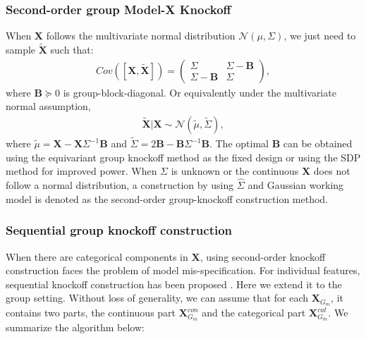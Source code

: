 \documentclass[11pt]{article}
\theoremstyle{plain}
\theoremstyle{definition}
\theoremstyle{remark}
\newcommand{\X}{\mathbf{X}}
\newcommand{\B}{\mathbf{B}}
\newcommand{\0}{\mathbf{0}}
\begin{document}
\subsubsection{Second-order group Model-X Knockoff}
When $\X$ follows the multivariate normal distribution $\mathcal{N}(\mu,\Sigma)$, we just need to sample $\widetilde{\X}$ such that:
\begin{eqnarray*}
Cov([\X, \widetilde{\X}])=\left(\begin{array}{cc}\Sigma &\Sigma-\B\\\Sigma-\B&\Sigma\end{array}\right),
\end{eqnarray*}
where $\B\succeq 0$ is group-block-diagonal. Or equivalently under the multivariate normal assumption, 
\begin{eqnarray*}
\widetilde{\X}|\X\sim \mathcal{N}(\widetilde{\mu},\widetilde{\Sigma}),
\end{eqnarray*}
where $\widetilde{\mu}=\X-\X\Sigma^{-1}\B$ and $\widetilde{\Sigma}=2\B-\B\Sigma^{-1}\B$. The optimal $\B$ can be obtained using the equivariant group knockoff method as the fixed design or using the SDP method for improved power. When $\Sigma$ is unknown or the continuous $\X$ does not follow a normal distribution, a construction by using $\widehat{\Sigma}$ and Gaussian working model is denoted as the second-order group-knockoff construction method.

\subsubsection{Sequential group knockoff construction}
When there are categorical components in $\X$, using second-order knockoff construction faces the problem of model mis-specification. For individual features, sequential knockoff construction has been proposed \citep{kormaksson2021}. Here we extend it to the group setting. Without loss of generality, we can assume that for each $\X_{G_m}$, it contains two parts, the continuous part $\X_{G_m}^{con}$ and the categorical part $\X_{G_m}^{cat}$. We summarize the algorithm below:


  
        
\end{document}
